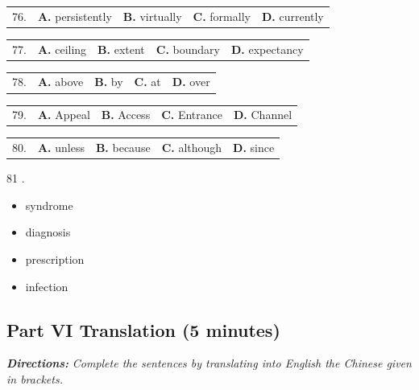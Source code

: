 \documentclass[UTF8,11pt]{ctexart}
\begin{document}
\noindent\begin{tabularx}{\linewidth}{@{}lXXXX@{}}76. & \textbf{A.} persistently & \textbf{B.} virtually & \textbf{C.} formally & \textbf{D.} currently\\\end{tabularx}\par

\noindent\begin{tabularx}{\linewidth}{@{}lXXXX@{}}77. & \textbf{A.} ceiling & \textbf{B.} extent & \textbf{C.} boundary & \textbf{D.} expectancy\\\end{tabularx}\par

\noindent\begin{tabularx}{\linewidth}{@{}lXXXX@{}}78. & \textbf{A.} above & \textbf{B.} by & \textbf{C.} at & \textbf{D.} over\\\end{tabularx}\par

\noindent\begin{tabularx}{\linewidth}{@{}lXXXX@{}}79. & \textbf{A.} Appeal & \textbf{B.} Access & \textbf{C.} Entrance & \textbf{D.} Channel\\\end{tabularx}\par

\noindent\begin{tabularx}{\linewidth}{@{}lXXXX@{}}80. & \textbf{A.} unless & \textbf{B.} because & \textbf{C.} although & \textbf{D.} since\\\end{tabularx}\par

81 .


\begin{itemize}[leftmargin=2em,itemsep=.2em,topsep=.4em]\item[A.] syndrome
\item[B.] diagnosis
\item[C.] prescription
\item[D.] infection
\end{itemize}

\subsection*{\textbf{Part VI} \textbf{Translation (5 minutes)}}


\textbf{\textit{Directions:}}\textit{ Complete the sentences by translating into English the Chinese given in brackets.}
\end{document}
